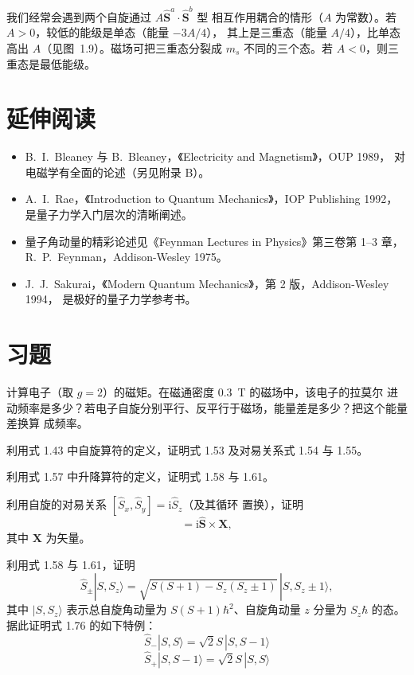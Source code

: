 我们经常会遇到两个自旋通过 $A\hat{\mathbf{S}}^{a}\cdot\hat{\mathbf{S}}^{b}$ 型
相互作用耦合的情形（$A$ 为常数）。若 $A>0$，较低的能级是单态（能量 $-3A/4$），
其上是三重态（能量 $A/4$），比单态高出 $A$（见图~1.9）。磁场可把三重态分裂成
$m_s$ 不同的三个态。若 $A<0$，则三重态是最低能级。

\section*{延伸阅读}

\begin{itemize}[itemsep=0.2em]
\item B.~I.~Bleaney 与 B.~Bleaney，《Electricity and Magnetism》，OUP 1989，
对电磁学有全面的论述（另见附录 B）。
\item A.~I.~Rae，《Introduction to Quantum Mechanics》，IOP Publishing 1992，
是量子力学入门层次的清晰阐述。
\item 量子角动量的精彩论述见《Feynman Lectures in Physics》第三卷第 1--3 章，
R.~P.~Feynman，Addison-Wesley 1975。
\item J.~J.~Sakurai，《Modern Quantum Mechanics》，第 2 版，Addison-Wesley 1994，
是极好的量子力学参考书。
\end{itemize}

\section*{习题}

 计算电子（取 $g=2$）的磁矩。在磁通密度 0.3~T 的磁场中，该电子的拉莫尔
进动频率是多少？若电子自旋分别平行、反平行于磁场，能量差是多少？把这个能量差换算
成频率。

 利用式 1.43 中自旋算符的定义，证明式 1.53 及对易关系式 1.54 与 1.55。

 利用式 1.57 中升降算符的定义，证明式 1.58 与 1.61。

 利用自旋的对易关系 $[\hat{S}_x,\hat{S}_y]=\mathrm{i}\hat{S}_z$（及其循环
置换），证明
\begin{equation*}
[\hat{\mathbf{S}}\cdot\mathbf{X}, \hat{\mathbf{S}}] = \mathrm{i}\hat{\mathbf{S}}\times\mathbf{X},\tag{1.75}
\end{equation*}
其中 $\mathbf{X}$ 为矢量。

 利用式 1.58 与 1.61，证明
\begin{equation*}
\hat{S}_{\pm}|S, S_z\rangle = \sqrt{S(S+1)-S_z(S_z\pm1)}\,|S, S_z\pm1\rangle,\tag{1.76}
\end{equation*}
其中 $|S,S_z\rangle$ 表示总自旋角动量为 $S(S+1)\hbar^{2}$、自旋角动量 $z$ 分量为
$S_z\hbar$ 的态。据此证明式 1.76 的如下特例：
\begin{equation*}
\hat{S}_{-}|S, S\rangle = \sqrt{2}S\,|S, S-1\rangle\tag{1.77}
\end{equation*}
\begin{equation*}
\hat{S}_{+}|S, S-1\rangle = \sqrt{2}S\,|S, S\rangle\tag{1.78}
\end{equation*}

